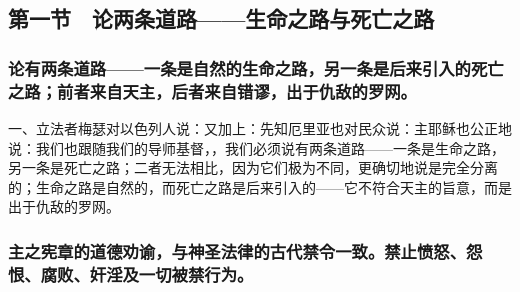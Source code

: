 \par


\subsection{第一节　论两条道路——生命之路与死亡之路}


\subsubsection{论有两条道路——一条是自然的生命之路，另一条是后来引入的死亡之路；前者来自天主，后者来自错谬，出于仇敌的罗网。}

一、立法者梅瑟对以色列人说：又加上：先知厄里亚也对民众说：主耶稣也公正地说：我们也跟随我们的导师基督，，我们必须说有两条道路——一条是生命之路，另一条是死亡之路；二者无法相比，因为它们极为不同，更确切地说是完全分离的；生命之路是自然的，而死亡之路是后来引入的——它不符合天主的旨意，而是出于仇敌的罗网。\par


\subsubsection{主之宪章的道德劝谕，与神圣法律的古代禁令一致。禁止愤怒、怨恨、腐败、奸淫及一切被禁行为。}

